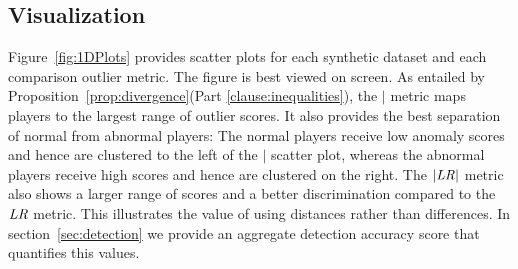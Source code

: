 						\subsection{Visualization}
						
						
						Figure~\ref{fig:1DPlots} provides scatter plots for each synthetic dataset and each comparison outlier metric. The figure is best viewed on screen. As entailed by Proposition~\ref{prop:divergence}(Part \ref{clause:inequalities}), the $\mid$ metric maps players to the largest range of outlier scores. It also provides the best separation of normal from abnormal players: The normal players receive low anomaly scores and hence are clustered to the left of the $\mid$ scatter plot, whereas the abnormal players receive high scores and hence are clustered on the right. The $|\it{LR}|$ metric  also shows a larger range of scores and a better discrimination compared to the $\it{LR}$ metric. This illustrates the value of using distances rather than differences. In section~\ref{sec:detection} we provide an aggregate detection accuracy score that quantifies this values.
						
						
						
